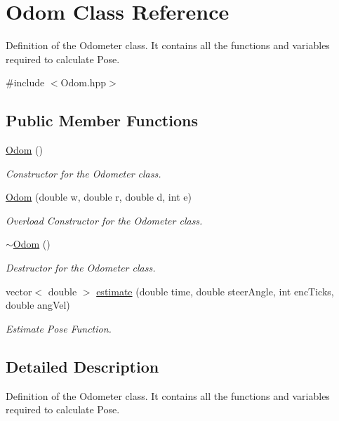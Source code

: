 \hypertarget{class_odom}{}\section{Odom Class Reference}
\label{class_odom}


Definition of the Odometer class. It contains all the functions and variables required to calculate Pose.  




{\ttfamily \#include $<$Odom.\+hpp$>$}

\subsection*{Public Member Functions}
\begin{DoxyCompactItemize}
\item 
\hyperlink{class_odom_a43a0ddfcf5e6120fdab5f217bf5289a1}{Odom} ()
\begin{DoxyCompactList}\small\item\em Constructor for the Odometer class. \end{DoxyCompactList}\item 
\hyperlink{class_odom_a361a163f9ad080a764d9a09567b7f19c}{Odom} (double w, double r, double d, int e)
\begin{DoxyCompactList}\small\item\em Overload Constructor for the Odometer class. \end{DoxyCompactList}\item 
\hyperlink{class_odom_ae59d3e9ca275631a390dcd5f33598b20}{$\sim$\+Odom} ()\hypertarget{class_odom_ae59d3e9ca275631a390dcd5f33598b20}{}\label{class_odom_ae59d3e9ca275631a390dcd5f33598b20}

\begin{DoxyCompactList}\small\item\em Destructor for the Odometer class. \end{DoxyCompactList}\item 
vector$<$ double $>$ \hyperlink{class_odom_a2fe35fdf9e4e778f753062ddd2cc2fe9}{estimate} (double time, double steer\+Angle, int enc\+Ticks, double ang\+Vel)
\begin{DoxyCompactList}\small\item\em Estimate Pose Function. \end{DoxyCompactList}\end{DoxyCompactItemize}


\subsection{Detailed Description}
Definition of the Odometer class. It contains all the functions and variables required to calculate Pose. 

